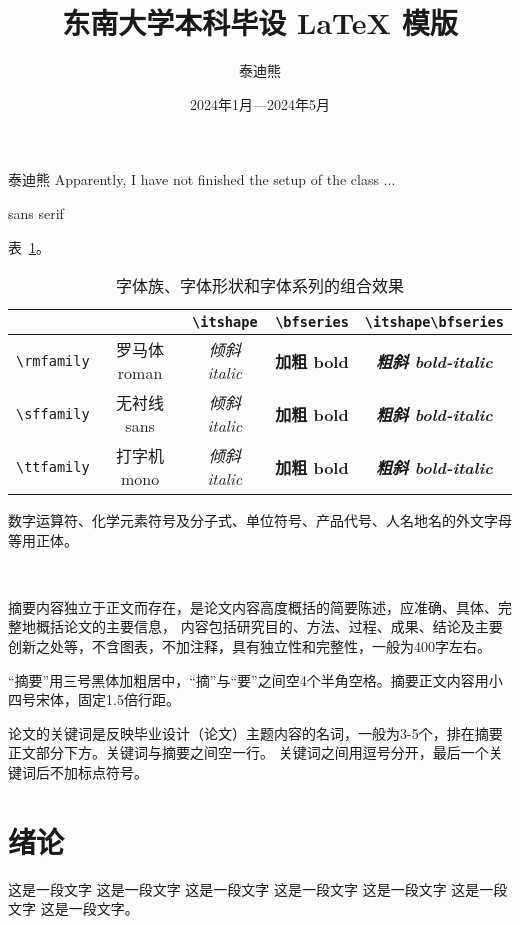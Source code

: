 \documentclass[fontset = mac ms]{seuthesis2024b}
\title{东南大学本科毕设 \LaTeX{} 模版}
\author{泰迪熊}
\date{2024年1月---2024年5月}
\begin{document}
  \maketitle

  泰迪熊 Apparently, I have not finished the setup of the class ...
  
  \textsf{sans serif}

  表~\ref{tab:font-effect}。

  \begin{table}[htbp]
    \centering
    \caption{字体族、字体形状和字体系列的组合效果}
    \label{tab:font-effect}
    \begin{tabular}{c|cccc}
      & & \verb|\itshape| & \verb|\bfseries| & \verb|\itshape\bfseries| \\
      \hline
      \verb|\rmfamily| & \rmfamily 罗马体 roman & \rmfamily\itshape 倾斜 italic & \rmfamily\bfseries 加粗 bold & \rmfamily\itshape\bfseries 粗斜 bold-italic \\
      \verb|\sffamily| & \sffamily 无衬线 sans  & \sffamily\itshape 倾斜 italic & \sffamily\bfseries 加粗 bold & \sffamily\itshape\bfseries 粗斜 bold-italic \\
      \verb|\ttfamily| & \ttfamily 打字机 mono  & \ttfamily\itshape 倾斜 italic & \ttfamily\bfseries 加粗 bold & \ttfamily\itshape\bfseries 粗斜 bold-italic
    \end{tabular}
  \end{table}

  \clearpage

  \noindent
  数字运算符、化学元素符号及分子式、单位符号、产品代号、人名地名的外文字母等用正体。

  ~

  \clearpage

  摘要内容独立于正文而存在，是论文内容高度概括的简要陈述，应准确、具体、完整地概括论文的主要信息，
  内容包括研究目的、方法、过程、成果、结论及主要创新之处等，不含图表，不加注释，具有独立性和完整性，一般为400字左右。

  “摘要”用三号黑体加粗居中，“摘”与“要”之间空4个半角空格。摘要正文内容用小四号宋体，固定1.5倍行距。
  
  论文的关键词是反映毕业设计（论文）主题内容的名词，一般为3-5个，排在摘要正文部分下方。关键词与摘要之间空一行。
  关键词之间用逗号分开，最后一个关键词后不加标点符号。

  \chapter{绪论}
    这是一段文字
    这是一段文字
    这是一段文字
    这是一段文字
    这是一段文字
    这是一段文字
    这是一段文字。
\end{document}
